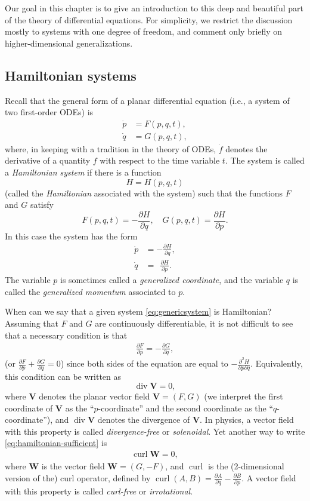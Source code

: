 \documentclass[12pt]{amsart}
\newcommand{\eq}[1]{\begin{equation}\begin{split}#1\end{split}\end{equation}}
\newcommand{\eqst}[1]{\begin{align*}#1\end{align*}}
\newcommand{\curl}{\operatorname{curl}}
\newcommand{\divr}{\operatorname{div}}
\begin{document}
Our goal in this chapter is to give an introduction to this deep and beautiful part of the theory of differential equations. For simplicity, we restrict the discussion mostly to systems with one degree of freedom, and comment only briefly on higher-dimensional generalizations.

\subsection{Hamiltonian systems}

Recall that the general form of a planar differential equation (i.e., a system of two first-order ODEs) is
\eq{ \label{eq:genericsystem}
\dot{p} &= F(p,q,t), \\
\dot{q} &= G(p,q,t),
}
where, in keeping with a tradition in the theory of ODEs, $\dot{f}$ denotes the derivative of a quantity $f$ with respect to the time variable $t$.
The system is called a \emph{Hamiltonian system} if there is a function 
$$H=H(p,q,t)$$ 
(called the \emph{Hamiltonian} associated with the system) such that the functions $F$ and $G$ satisfy $$F(p,q,t) = -\frac{\partial H}{\partial q}, \quad G(p,q,t) = \frac{\partial H}{\partial p}.$$
In this case the system has the form
\eq{ \label{eq:hamiltoniansystem}
\dot{p} &= -\frac{\partial H}{\partial q}, \\
\dot{q} &= \ \ \frac{\partial H}{\partial p}.
}
The variable $p$ is sometimes called a \emph{generalized coordinate}, and the variable $q$ is called the \emph{generalized momentum} associated to $p$.

When can we say that a given system \eqref{eq:genericsystem} is Hamiltonian? Assuming that $F$ and $G$ are continuously differentiable, it is not difficult to see that a necessary condition is that
\eq{ \label{eq:hamiltonian-sufficient}
\frac{\partial F}{\partial p} = -\frac{\partial G}{\partial q},
}
(or $\frac{\partial F}{\partial p} +\frac{\partial G}{\partial q}=0$) since both sides of the equation are equal to $-\frac{\partial^2 H}{\partial p \partial q}$. Equivalently, this condition can be written as
$$ \divr \mathbf{V} = 0, $$
where $\mathbf{V}$ denotes the planar vector field $\mathbf{V}= (F,G)$ (we interpret the first coordinate of $\mathbf{V}$ as the ``$p$-coordinate'' and the second coordinate as the ``$q$-coordinate''), and $\divr \mathbf{V}$ denotes the divergence of $\mathbf{V}$. In physics, a vector field with this property is called \emph{divergence-free} or \emph{solenoidal}. Yet another way to write \eqref{eq:hamiltonian-sufficient} is
\eqst{
\curl \mathbf{W} = 0, 
}
where $\mathbf{W}$ is the vector field $\mathbf{W}=(G,-F)$, and $\curl$ is the (2-dimensional version of the) curl operator, defined by $\curl(A,B) = \frac{\partial A}{\partial q}-\frac{\partial B}{\partial p}$. A vector field with this property is called \emph{curl-free} or \emph{irrotational}.
\end{document}
